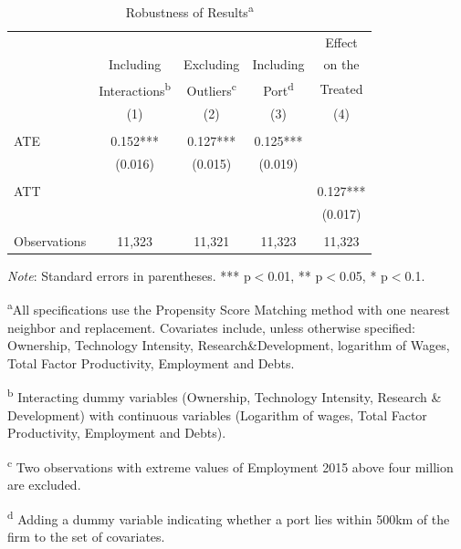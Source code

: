\documentclass[a4paper,11pt]{scrartcl}
\begin{document}
\begin{table}[h]
  \centering
   \caption{Robustness of Results\textsuperscript{a}}
   \label{tab:robust}
\begin{threeparttable}
 
\begin{tabular}{lcccc} 
	\hline 
	\hline
 		& & & & Effect \\
 		& Including & Excluding & Including & on the\\
 		& Interactions\textsuperscript{b} & Outliers\textsuperscript{c} 
 		& Port\textsuperscript{d} & Treated \\
 		& (1) & (2) & (3) & (4) \\ 
 	\hline
 		&  &  &  &  \\
ATE 	& 0.152*** & 0.127*** & 0.125*** &  \\
 		& (0.016) & (0.015) & (0.019) &  \\
 		&  &  &  &  \\
ATT 	&  &  &  & 0.127*** \\
 		&  &  &  & (0.017) \\
 		&  &  &  &  \\
Observations & 11,323 & 11,321 & 11,323 & 11,323 \\ 
	\hline
	\hline
\end{tabular}

\begin{tablenotes}[flushleft]
     \footnotesize
\item \textit{Note}: Standard errors in parentheses. *** p$<$0.01, ** p$<$0.05, * p$<$0.1.    
     
\item\textsuperscript{a}All specifications use the Propensity Score Matching method with one nearest neighbor and replacement. Covariates include, unless otherwise specified: Ownership, Technology Intensity, Research\&Development, logarithm of Wages, Total Factor Productivity, Employment and Debts. 

\item\textsuperscript{b} Interacting dummy variables (Ownership, Technology Intensity, Research \& Development) with continuous variables (Logarithm of wages, Total Factor Productivity, Employment and Debts).  

\item\textsuperscript{c} Two observations with extreme values of Employment 2015 above four million are excluded.
 
\item\textsuperscript{d} Adding a dummy variable indicating whether a port lies within 500km of the firm to the set of covariates.
\end{tablenotes}

\end{threeparttable}
\end{table}
\end{document}

